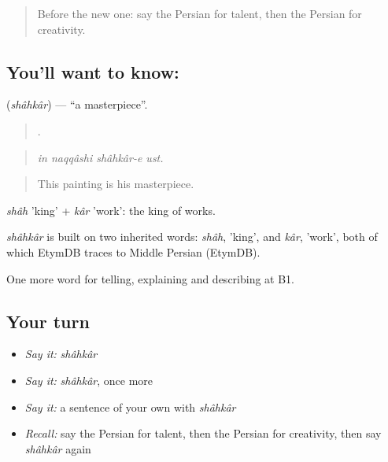 \label{lesson:FA-C527-shahkar}



\begin{quote}
Before the new one: say the Persian for talent, then the Persian for creativity.
\end{quote}

\subsection*{You'll want to know: }
\textbf{} (\emph{shâhkâr}) — \textquotedblleft{}a masterpiece\textquotedblright{}.

\begin{quote}
   .
\end{quote}

\begin{quote}
\emph{in naqqâshi shâhkâr-e ust.}
\end{quote}

\begin{quote}
This painting is his masterpiece.
\end{quote}

\emph{shâh} 'king' + \emph{kâr} 'work': the king of works.

\begin{cousinweb}
\emph{shâhkâr} is built on two inherited words: \emph{shâh}, 'king', and \emph{kâr}, 'work', both of which EtymDB traces to Middle Persian (EtymDB).
\end{cousinweb}

\begin{grammarlens}[title={What you've built}]
One more word for telling, explaining and describing at B1.
\end{grammarlens}

\subsection*{Your turn}
\begin{itemize}
\raggedright
  \item \emph{Say it:} \emph{shâhkâr}
  \item \emph{Say it:} \emph{shâhkâr}, once more
  \item \emph{Say it:} a sentence of your own with \emph{shâhkâr}
  \item \emph{Recall:} say the Persian for talent, then the Persian for creativity, then say \emph{shâhkâr} again
\end{itemize}

